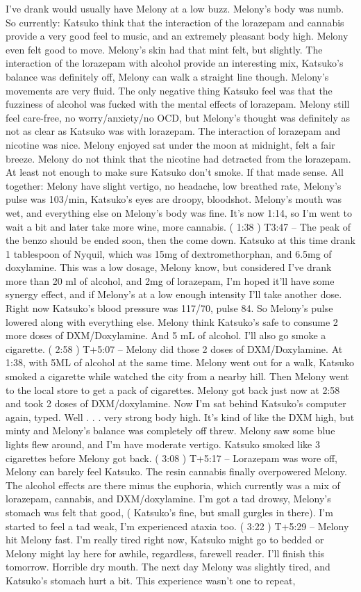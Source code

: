 \documentclass[12pt]{book}
\begin{document}
I've drank would usually have Melony at a low buzz. Melony's body was numb. So currently: Katsuko think that the interaction of the lorazepam and cannabis provide a very good feel to music, and an extremely pleasant body high. Melony even felt good to move. Melony's skin had that mint felt, but slightly. The interaction of the lorazepam with alcohol provide an interesting mix, Katsuko's balance was definitely off, Melony can walk a straight line though. Melony's movements are very fluid. The only negative thing Katsuko feel was that the fuzziness of alcohol was fucked with the mental effects of lorazepam. Melony still feel care-free, no worry/anxiety/no OCD, but Melony's thought was definitely as not as clear as Katsuko was with lorazepam. The interaction of lorazepam and nicotine was nice. Melony enjoyed sat under the moon at midnight, felt a fair breeze. Melony do not think that the nicotine had detracted from the lorazepam. At least not enough to make sure Katsuko don't smoke. If that made sense. All together: Melony have slight vertigo, no headache, low breathed rate, Melony's pulse was 103/min, Katsuko's eyes are droopy, bloodshot. Melony's mouth was wet, and everything else on Melony's body was fine. It's now 1:14, so I'm went to wait a bit and later take more wine, more cannabis. ( 1:38 ) T3:47 -- The peak of the benzo should be ended soon, then the come down. Katsuko at this time drank 1 tablespoon of Nyquil, which was 15mg of dextromethorphan, and 6.5mg of doxylamine. This was a low dosage, Melony know, but considered I've drank more than 20 ml of alcohol, and 2mg of lorazepam, I'm hoped it'll have some synergy effect, and if Melony's at a low enough intensity I'll take another dose. Right now Katsuko's blood pressure was 117/70, pulse 84. So Melony's pulse lowered along with everything else. Melony think Katsuko's safe to consume 2 more doses of DXM/Doxylamine. And 5 mL of alcohol. I'll also go smoke a cigarette. ( 2:58 ) T+5:07 -- Melony did those 2 doses of DXM/Doxylamine. At 1:38, with 5ML of alcohol at the same time. Melony went out for a walk, Katsuko smoked a cigarette while watched the city from a nearby hill. Then Melony went to the local store to get a pack of cigarettes. Melony got back just now at 2:58 and took 2 doses of DXM/doxylamine. Now I'm sat behind Katsuko's computer again, typed. Well . . .  very strong body high. It's kind of like the DXM high, but minty and Melony's balance was completely off threw. Melony saw some blue lights flew around, and I'm have moderate vertigo. Katsuko smoked like 3 cigarettes before Melony got back. ( 3:08 ) T+5:17 -- Lorazepam was wore off, Melony can barely feel Katsuko. The resin cannabis finally overpowered Melony. The alcohol effects are there minus the euphoria, which currently was a mix of lorazepam, cannabis, and DXM/doxylamine. I'm got a tad drowsy, Melony's stomach was felt that good, ( Katsuko's fine, but small gurgles in there). I'm started to feel a tad weak, I'm experienced ataxia too. ( 3:22 ) T+5:29 -- Melony hit Melony fast. I'm really tired right now, Katsuko might go to bedded or Melony might lay here for awhile, regardless, farewell reader. I'll finish this tomorrow. Horrible dry mouth. The next day Melony was slightly tired, and Katsuko's stomach hurt a bit. This experience wasn't one to repeat, 
\end{document}
